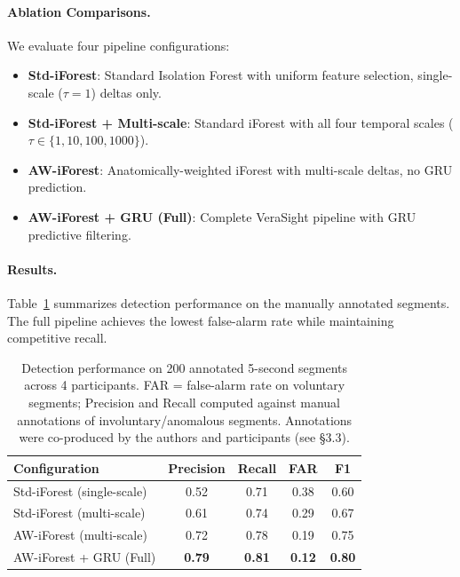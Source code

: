 \documentclass[sigconf]{acmart}
\begin{document}
\paragraph{Ablation Comparisons.}
We evaluate four pipeline configurations:
\begin{itemize}
    \item \textbf{Std-iForest}: Standard Isolation Forest with uniform feature selection, single-scale ($\tau=1$) deltas only.
    \item \textbf{Std-iForest + Multi-scale}: Standard iForest with all four temporal scales ($\tau \in \{1,10,100,1000\}$).
    \item \textbf{AW-iForest}: Anatomically-weighted iForest with multi-scale deltas, no GRU prediction.
    \item \textbf{AW-iForest + GRU (Full)}: Complete VeraSight pipeline with GRU predictive filtering.
\end{itemize}

\paragraph{Results.}
Table~\ref{tab:ablation} summarizes detection performance on the manually annotated segments. The full pipeline achieves the lowest false-alarm rate while maintaining competitive recall.

\begin{table}[h]
\centering
\caption{Detection performance on 200 annotated 5-second segments across 4 participants. FAR = false-alarm rate on voluntary segments; Precision and Recall computed against manual annotations of involuntary/anomalous segments. Annotations were co-produced by the authors and participants (see §3.3).}
\label{tab:ablation}
\small
\begin{tabular}{lcccc}
\toprule
\textbf{Configuration} & \textbf{Precision} & \textbf{Recall} & \textbf{FAR} & \textbf{F1} \\
\midrule
Std-iForest (single-scale) & 0.52 & 0.71 & 0.38 & 0.60 \\
Std-iForest (multi-scale) & 0.61 & 0.74 & 0.29 & 0.67 \\
AW-iForest (multi-scale) & 0.72 & 0.78 & 0.19 & 0.75 \\
AW-iForest + GRU (Full) & \textbf{0.79} & \textbf{0.81} & \textbf{0.12} & \textbf{0.80} \\
\bottomrule
\end{tabular}
\end{table}
\end{document}
